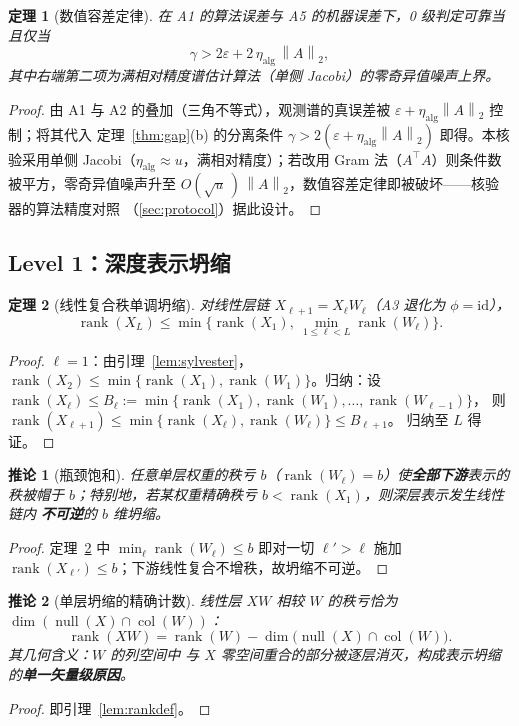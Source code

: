 \documentclass[UTF8,11pt,a4paper]{ctexart}
\theoremstyle{plain}
\newtheorem{theorem}{定理}
\newtheorem{corollary}{推论}
\theoremstyle{definition}
\theoremstyle{remark}
\newcommand{\rank}{\operatorname{rank}}
\newcommand{\nullsp}{\operatorname{null}}
\newcommand{\colsp}{\operatorname{col}}
\newcommand{\Tnorm}[1]{\left\lVert #1\right\rVert_2}
\begin{document}
\begin{theorem}[数值容差定律]\label{thm:numtol}
在 A1 的算法误差与 A5 的机器误差下，0 级判定可靠当且仅当
\[
\gamma>2\varepsilon+2\,\eta_{\mathrm{alg}}\,\Tnorm{A},
\]
其中右端第二项为满相对精度谱估计算法（单侧 Jacobi）的零奇异值噪声上界。
\end{theorem}
\begin{proof}
由 A1 与 A2 的叠加（三角不等式），观测谱的真误差被
$\varepsilon+\eta_{\mathrm{alg}}\Tnorm{A}$ 控制；将其代入
定理~\ref{thm:gap}(b) 的分离条件
$\gamma>2(\varepsilon+\eta_{\mathrm{alg}}\Tnorm{A})$ 即得。本核验采用单侧
Jacobi（$\eta_{\mathrm{alg}}\approx u$，满相对精度\cite{demmel1992}）；若改用
Gram 法（$A^\top A$）则条件数被平方，零奇异值噪声升至
$O(\sqrt u\,)\,\Tnorm{A}$，数值容差定律即被破坏——核验器的算法精度对照
（\textsection\ref{sec:protocol}）据此设计。
\end{proof}

\subsection{Level 1：深度表示坍缩}\label{sec:main:l1}

\begin{theorem}[线性复合秩单调坍缩]\label{thm:collapse}
对线性层链 $X_{\ell+1}=X_\ell W_\ell$（A3 退化为 $\phi=\mathrm{id}$），
\[
\rank(X_L)\le\min\Big\{\rank(X_1),\ \min_{1\le\ell<L}\rank(W_\ell)\Big\}.
\]
\end{theorem}
\begin{proof}
$\ell=1$：由引理~\ref{lem:sylvester}，
$\rank(X_2)\le\min\{\rank(X_1),\rank(W_1)\}$。归纳：设
$\rank(X_\ell)\le B_\ell:=\min\{\rank(X_1),\rank(W_1),\dots,\rank(W_{\ell-1})\}$，
则
$\rank(X_{\ell+1})\le\min\{\rank(X_\ell),\rank(W_\ell)\}\le B_{\ell+1}$。
归纳至 $L$ 得证。
\end{proof}

\begin{corollary}[瓶颈饱和]\label{cor:bottleneck}
任意单层权重的秩亏 $b$（$\rank(W_\ell)=b$）使\textbf{全部下游}表示的秩被帽于
$b$；特别地，若某权重精确秩亏 $b<\rank(X_1)$，则深层表示发生线性链内
\textbf{不可逆}的 $b$ 维坍缩。
\end{corollary}
\begin{proof}
定理~\ref{thm:collapse} 中 $\min_\ell\rank(W_\ell)\le b$ 即对一切 $\ell'>\ell$
施加 $\rank(X_{\ell'})\le b$；下游线性复合不增秩，故坍缩不可逆。
\end{proof}

\begin{corollary}[单层坍缩的精确计数]\label{thm:layerdef}
线性层 $XW$ 相较 $W$ 的秩亏恰为 $\dim(\nullsp(X)\cap\colsp(W))$：
\[
\rank(XW)=\rank(W)-\dim\big(\nullsp(X)\cap\colsp(W)\big).
\]
其几何含义：$W$ 的列空间中
与 $X$ 零空间重合的部分被逐层消灭，构成表示坍缩的\textbf{单一矢量级原因}。
\end{corollary}
\begin{proof}
即引理~\ref{lem:rankdef}。
\end{proof}
\end{document}
